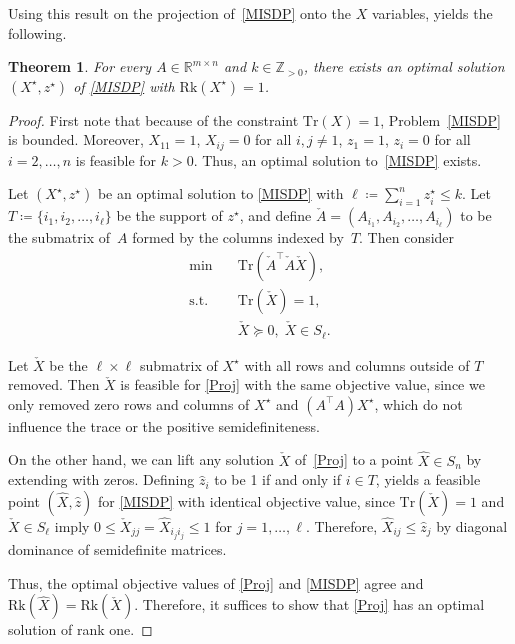 \documentclass[journal]{IEEEtran}
\newtheorem{theorem}{Theorem}
\newcommand{\define}{\coloneqq}
\newcommand{\T}{^{\top}}
\newcommand{\Tr}{\text{Tr}}
\newcommand{\Rk}{\text{Rk}}
\newcommand{\R}{\mathds{R}}
\newcommand{\Z}{\mathds{Z}}
\begin{document}
Using this result on the projection of~\eqref{MISDP} onto the $X$ variables, yields the following.

\begin{theorem}\label{Rk1thm}
  For every $A \in \R^{m \times n}$ and $k \in \Z_{>0}$, there exists an optimal solution $(X^\star, z^\star)$ of \eqref{MISDP} with $\Rk(X^\star) = 1$. 
\end{theorem}

\begin{proof}
  First note that because of the constraint $\Tr(X) = 1$,
  Problem~\eqref{MISDP} is bounded. Moreover, $X_{11} = 1$, $X_{ij} = 0$
  for all $i,j \neq 1$, $z_1 = 1$, $z_i = 0$ for all $i = 2, \dots, n$ is
  feasible for $k > 0$. Thus, an optimal solution to~\eqref{MISDP} exists.

  Let $(X^\star, z^\star)$ be an optimal solution to \eqref{MISDP} with
  $\ell \define \sum_{i=1}^n z^\star_i \leq k$. Let $T \define \{i_1, i_2,
  \dots, i_\ell\}$ be the support of $z^\star$, and define $\check{A} =
  (A_{i_1}, A_{i_2}, \dots, A_{i_\ell})$ to be the submatrix of~$A$ formed by
  the columns indexed by~$T$. Then consider
  \begin{align}\label{Proj}
    \min \quad & \Tr(\check{A}\T \check{A} \check{X}), \nonumber \\
    \text{s.t.} \quad & \Tr(\check{X}) = 1, \\
    & \check{X} \succeq 0,\; \check{X} \in S_\ell.\nonumber 
  \end{align}

  Let $\check{X}$ be the $\ell \times \ell$ submatrix of $X^\star$ with all
  rows and columns outside of $T$ removed. Then $\check{X}$ is feasible for
  \eqref{Proj} with the same objective value, since we only removed zero
  rows and columns of $X^\star$ and $(A\T A) X^\star$, which do not
  influence the trace or the positive semidefiniteness.

  On the other hand, we can lift any solution $\check{X}$ of~\eqref{Proj}
  to a point $\hat{X} \in S_n$ by extending with zeros. Defining
  $\hat{z}_i$ to be 1 if and only if $i \in T$, yields a feasible point
  $(\hat{X}, \hat{z})$ for \eqref{MISDP} with identical objective value,
  since $\Tr(\check{X}) = 1$ and $\check{X} \in S_\ell$ imply $0 \leq
  \check{X}_{jj} = \hat{X}_{i_j i_j} \leq 1$ for $j = 1, \dots,
  \ell$. Therefore, $\hat{X}_{ij} \leq \hat{z}_j$ by diagonal dominance of
  semidefinite matrices.

  Thus, the optimal objective values of \eqref{Proj} and \eqref{MISDP}
  agree and $\Rk(\hat{X}) = \Rk(\check{X})$.  Therefore, it
  suffices to show that \eqref{Proj} has an optimal solution of rank one.


\end{proof}
\end{document}
